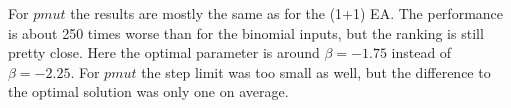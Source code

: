 For $pmut$ the results are mostly the same as for the (1+1) EA.
The performance is about 250 times worse than for the binomial inputs, but the ranking is still pretty close.
Here the optimal parameter is around $\beta=-1.75$ instead of $\beta=-2.25$.
For $pmut$ the step limit was too small as well, but the difference to the optimal solution was only one on average.